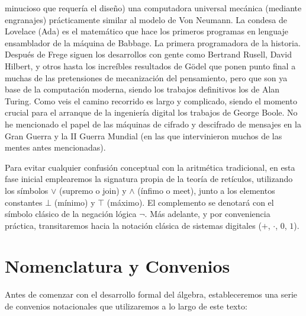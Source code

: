 minucioso que requería el diseño) una computadora universal mecánica (mediante engranajes) prácticamente similar al modelo de Von Neumann. La condesa de Lovelace (Ada) es el matemático que hace los primeros programas en lenguaje ensamblador de la máquina de Babbage. La primera programadora de la historia. Después de Frege siguen los desarrollos con gente como Bertrand Rusell, David Hilbert, y otros hasta los increíbles resultados de Gödel que ponen punto final a muchas de las pretensiones de mecanización del pensamiento, pero que son ya base de la computación moderna, siendo los trabajos definitivos los de Alan Turing. Como veis el camino recorrido es largo y complicado, siendo el momento crucial para el arranque de la ingeniería digital los trabajos de George Boole. No he mencionado el papel de las máquinas de cifrado y descifrado de mensajes en la Gran Guerra y la II Guerra Mundial (en las que intervinieron muchos de las mentes antes mencionadas).

Para evitar cualquier confusión conceptual con la aritmética tradicional, en esta fase inicial emplearemos la signatura propia de la teoría de retículos, utilizando los símbolos $\vee$ (supremo o join) y $\wedge$ (ínfimo o meet), junto a los elementos constantes $\bot$ (mínimo) y $\top$ (máximo). El complemento se denotará con el símbolo clásico de la negación lógica $\neg$. Más adelante, y por conveniencia práctica, transitaremos hacia la notación clásica de sistemas digitales ($+$, $\cdot$, $0$, $1$).

\section{Nomenclatura y Convenios}
Antes de comenzar con el desarrollo formal del álgebra, estableceremos una serie de convenios notacionales que utilizaremos a lo largo de este texto:

